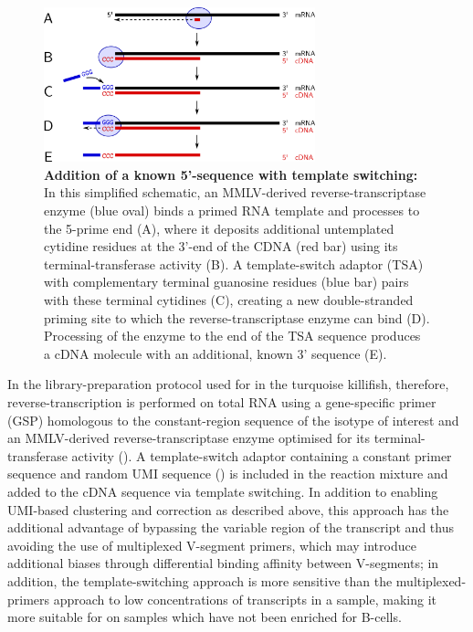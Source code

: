 \begin{figure}
\centering
\includegraphics[width=0.7\textwidth]{_Figures/png_edited/template-switch-labelled}
\vspace{0.5em}
\caption{\textbf{Addition of a known 5'-sequence with template switching:} In this simplified schematic, an MMLV-derived reverse-transcriptase enzyme (blue oval) binds a primed RNA template and processes to the 5-prime end (A), where it deposits additional untemplated cytidine residues at the 3'-end of the CDNA (red bar) using its terminal-transferase activity (B). A template-switch adaptor (TSA) with complementary terminal guanosine residues (blue bar) pairs with these terminal cytidines (C), creating a new double-stranded priming site to which the reverse-transcriptase enzyme can bind (D). Processing of the enzyme to the end of the TSA sequence produces a cDNA molecule with an additional, known 3' sequence (E).}
\label{fig:template-switch-schema}
\end{figure}

In the library-preparation protocol used for \Igseq in the turquoise killifish, therefore, reverse-transcription is performed on total RNA using a gene-specific primer (GSP) homologous to the constant-region sequence of the isotype of interest and an MMLV-derived reverse-transcriptase enzyme optimised for its terminal-transferase activity (). A template-switch adaptor containing a constant primer sequence and random UMI sequence () is included in the reaction mixture and added to the cDNA sequence via template switching. In addition to enabling UMI-based clustering and correction as described above, this approach has the additional advantage of bypassing the variable region of the \igh{} transcript and thus avoiding the use of multiplexed V-segment primers, which may introduce additional biases through differential binding affinity between V-segments; in addition, the template-switching approach is more sensitive than the multiplexed-primers approach to low concentrations of \igh{} transcripts in a sample, making it more suitable for \Igseq on samples which have not been enriched for B-cells. %

